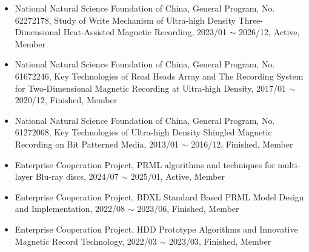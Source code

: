 \documentclass[en]{resume}
\begin{document}

\begin{itemize}
  \item National Natural Science Foundation of China, General Program, No. 62272178, Study of Write Mechanism of Ultra-high Density Three-Dimensional
  Heat-Assisted Magnetic Recording, 2023/01 $\sim$ 2026/12, Active, Member
  \item National Natural Science Foundation of China, General Program, No. 61672246, Key Technologies of Read Heads Array and The Recording System for
  Two-Dimensional Magnetic Recording at Ultra-high Density, 2017/01 $\sim$ 2020/12, Finished, Member
  \item National Natural Science Foundation of China, General Program, No. 61272068, Key Technologies of Ultra-high Density Shingled Magnetic Recording on Bit Patterned Media, 2013/01 $\sim$ 2016/12, Finished, Member
  \item Enterprise Cooperation Project, PRML algorithms and techniques for multi-layer Blu-ray discs, 2024/07 $\sim$ 2025/01, Active, Member 
  \item Enterprise Cooperation Project, BDXL Standard Based PRML Model Design and Implementation, 2022/08 $\sim$ 2023/06, Finished, Member
  \item Enterprise Cooperation Project, HDD Prototype Algorithms and Innovative Magnetic Record Technology, 2022/03 $\sim$ 2023/03, Finished, Member 
  
\end{itemize}
\end{document}
